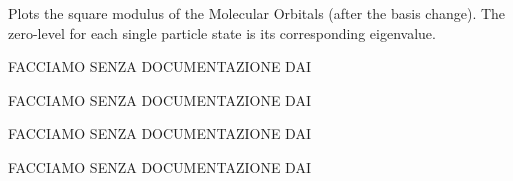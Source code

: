 \documentclass[letterpaper,10pt,english]{sphinxmanual}
\begin{document}
\begin{fulllineitems}

\begin{fulllineitems}
\label{\detokenize{index:do.GHF.plot_MO}}
Plots the square modulus of the Molecular Orbitals (after the basis change).
The zero-level for each single particle state is its corresponding eigenvalue.

\end{fulllineitems}


\begin{fulllineitems}
\label{\detokenize{index:do.GHF.plot_delta_per_iteration}}
FACCIAMO SENZA DOCUMENTAZIONE DAI

\end{fulllineitems}


\begin{fulllineitems}
\label{\detokenize{index:do.GHF.plot_dipole}}
FACCIAMO SENZA DOCUMENTAZIONE DAI

\end{fulllineitems}


\begin{fulllineitems}
\label{\detokenize{index:do.GHF.plot_dipoles}}
FACCIAMO SENZA DOCUMENTAZIONE DAI

\end{fulllineitems}


\begin{fulllineitems}
\label{\detokenize{index:do.GHF.plot_energy_per_iteration}}
FACCIAMO SENZA DOCUMENTAZIONE DAI


\end{fulllineitems}
\end{fulllineitems}
\end{document}
